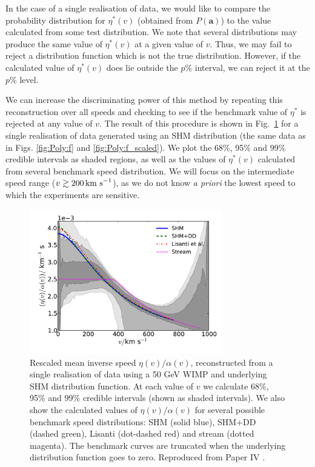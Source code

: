 In the case of a single realisation of data, we would like to compare the probability distribution for $\eta^*(v)$ (obtained from $P(\textbf{a})$) to the value calculated from some test distribution. We note that several distributions may produce the same value of $\eta^*(v)$ at a given value of $v$. Thus, we may fail to reject a distribution function which is not the true distribution. However, if the calculated value of $\eta^*(v)$ does lie outside the $p\%$ interval, we can reject it at the $p\%$ level.

We can increase the discriminating power of this method by repeating this reconstruction over all speeds and checking to see if the benchmark value of $\eta^*$ is rejected at any value of $v$. The result of this procedure is shown in Fig.~\ref{fig:Poly:eta} for a single realisation of data generated using an SHM distribution (the same data as in Figs. \ref{fig:Poly:f} and \ref{fig:Poly:f_scaled}). We plot the 68\%, 95\% and 99\% credible intervals as shaded regions, as well as the values of $\eta^*(v)$ calculated from several benchmark speed distribution. We will focus on the intermediate speed range ($v \gtrsim 200 \,\textrm{km s}^{-1}$), as we do not know \textit{a priori} the lowest speed to which the experiments are sensitive.


\begin{figure}[t]
\centering
  \includegraphics[width=0.75\textwidth]{Poly/SHM_lores.pdf}
  \caption[Rescaled mean inverse speed for a single realisation of data for a 50 GeV WIMP with SHM distribution function, showing several benchmark speed distributions for comparison]{Rescaled mean inverse speed $\eta(v)/\alpha(v)$, reconstructed from a single realisation of data using a 50 GeV WIMP and underlying SHM distribution function. At each value of $v$ we calculate 68\%, 95\% and 99\% credible intervals (shown as shaded intervals). We also show the calculated values of $\eta(v)/\alpha(v)$ for several possible benchmark speed distributions: SHM (solid blue), SHM+DD (dashed green), Lisanti \etal (dot-dashed red) and stream (dotted magenta). The benchmark curves are truncated when the underlying distribution function goes to zero. Reproduced from Paper IV \cite{Kavanagh:2014}.}
  \label{fig:Poly:eta}
\end{figure}

